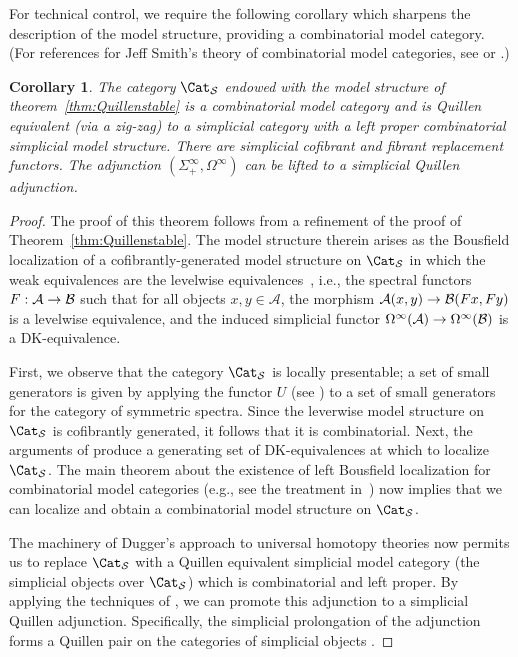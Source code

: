 \documentclass{amsart}
\renewcommand{\to}{\mathchoice{\longrightarrow}{\rightarrow}{\rightarrow}{\rightarrow}}
\newcommand{\cA}{{\mathcal A}}
\newcommand{\cB}{{\mathcal B}}
\newcommand{\Spcat}{\Cat_\mathcal{S}}%
\renewcommand{\i}{\infty}
\numberwithin{equation}{section}
\newtheorem{corollary}[equation]{Corollary}
\theoremstyle{definition}
\begin{document}
For technical control, we require the following corollary which
sharpens the description of the model structure, providing a
combinatorial model category.  (For references for Jeff Smith's theory
of combinatorial model categories, see \cite{BarwickLoc}
or \cite{Dugger}.)

\begin{corollary}\label{cor:Quillencombi}
The category $\Spcat$ endowed with the model structure of
theorem~\ref{thm:Quillenstable} is a combinatorial model category and
is Quillen equivalent (via a zig-zag) to a simplicial 
category with a left proper combinatorial simplicial model structure.
There are simplicial cofibrant and fibrant replacement functors.  The
adjunction $(\Sigma^{\infty}_+, \Omega^\i)$ can be lifted to a
simplicial Quillen adjunction.
\end{corollary}

\begin{proof}
The proof of this theorem follows from a refinement of the proof of
Theorem~\ref{thm:Quillenstable}.  The model structure therein 
arises as the Bousfield localization of a cofibrantly-generated model
structure on $\Spcat$ in which the weak equivalences are the levelwise
equivalences~\cite[\S4]{Spectral}, i.e., the spectral functors
$F: \cA \to \cB$ such that for all objects $x, y \in \cA$, the
morphism $\cA(x,y) \to \cB(Fx,Fy)$ is a levelwise equivalence, and the
induced simplicial functor $\Omega^\i(\cA) \to \Omega^\i(\cB)$ is a
DK-equivalence.

First, we observe that the category $\Spcat$ is locally
presentable; a set of small generators is given by applying the
functor $U$ (see \cite[A.1]{Spectral}) to a set of small 
generators for the category of symmetric spectra. Since the leverwise model structure on $\Spcat$ is cofibrantly generated, it follows that it is combinatorial.  Next, the
arguments of \cite{Spectral} produce a generating set of
DK-equivalences at which to localize $\Spcat$.  The main
theorem about the existence of left Bousfield localization for
combinatorial model categories (e.g., see the treatment
in~\cite{BarwickLoc}) now implies that we can localize and obtain a
combinatorial model structure on $\Spcat$.

The machinery of Dugger's approach to universal homotopy
theories \cite{Dugger} now permits us to replace $\Spcat$ with a
Quillen equivalent simplicial model category (the simplicial objects
over $\Spcat$) which is combinatorial and left proper.  By applying
the techniques of \cite{Dugger, RezkSchwedeShipley}, we can promote
this adjunction to a simplicial Quillen adjunction.  Specifically, the
simplicial prolongation of the adjunction forms a Quillen pair on the
categories of simplicial objects \cite[6.1]{RezkSchwedeShipley}.
\end{proof}
\end{document}
